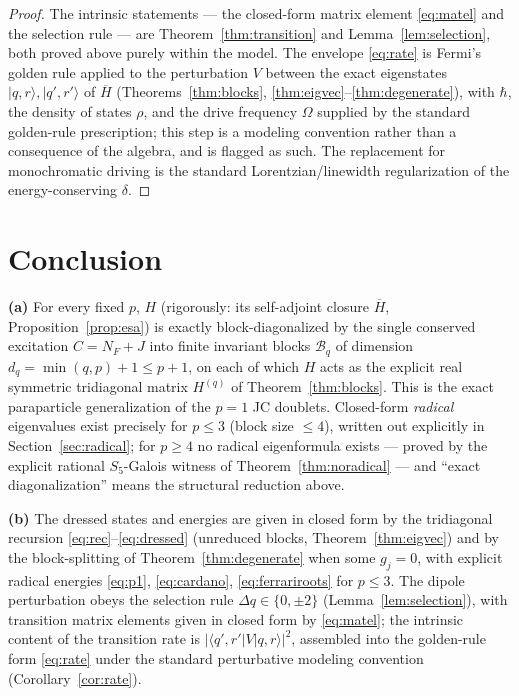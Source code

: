 \documentclass[12pt]{article}
\theoremstyle{definition}
\theoremstyle{remark}
\newcommand{\ket}[1]{\lvert #1\rangle}
\newcommand{\bra}[1]{\langle #1\rvert}
\begin{document}
\begin{proof}
The intrinsic statements — the closed-form matrix element \eqref{eq:matel} and the
selection rule — are Theorem~\ref{thm:transition} and Lemma~\ref{lem:selection},
both proved above purely within the model. The envelope \eqref{eq:rate} is Fermi's
golden rule applied to the perturbation $V$ between the exact eigenstates
$\ket{q,r},\ket{q',r'}$ of $\overline H$ (Theorems~\ref{thm:blocks},
\ref{thm:eigvec}--\ref{thm:degenerate}), with $\hbar$, the density of states $\rho$,
and the drive frequency $\Omega$ supplied by the standard golden-rule prescription;
this step is a modeling convention rather than a consequence of the algebra, and is
flagged as such. The replacement for monochromatic driving is the standard
Lorentzian/linewidth regularization of the energy-conserving $\delta$.
\end{proof}

\section{Conclusion}

\textbf{(a)} For every fixed $p$, $H$ (rigorously: its self-adjoint closure
$\overline H$, Proposition~\ref{prop:esa}) is exactly block-diagonalized by the
single conserved excitation $C=N_F+J$ into finite invariant blocks $\mathcal B_q$ of
dimension $d_q=\min(q,p)+1\le p+1$, on each of which $H$ acts as the explicit real
symmetric tridiagonal matrix $H^{(q)}$ of Theorem~\ref{thm:blocks}. This is the
exact paraparticle generalization of the $p=1$ JC doublets. Closed-form
\emph{radical} eigenvalues exist precisely for $p\le3$ (block size $\le4$), written
out explicitly in Section~\ref{sec:radical}; for $p\ge4$ no radical eigenformula
exists — proved by the explicit rational $S_5$-Galois witness of
Theorem~\ref{thm:noradical} — and ``exact diagonalization'' means the structural
reduction above.

\textbf{(b)} The dressed states and energies are given in closed form by the
tridiagonal recursion \eqref{eq:rec}--\eqref{eq:dressed} (unreduced blocks,
Theorem~\ref{thm:eigvec}) and by the block-splitting of
Theorem~\ref{thm:degenerate} when some $g_j=0$, with explicit radical energies
\eqref{eq:p1}, \eqref{eq:cardano}, \eqref{eq:ferrariroots} for $p\le3$. The dipole
perturbation obeys the selection rule $\Delta q\in\{0,\pm2\}$
(Lemma~\ref{lem:selection}), with transition matrix elements given in closed form by
\eqref{eq:matel}; the intrinsic content of the transition rate is
$|\bra{q',r'}V\ket{q,r}|^2$, assembled into the golden-rule form \eqref{eq:rate}
under the standard perturbative modeling convention (Corollary~\ref{cor:rate}).
\end{document}
